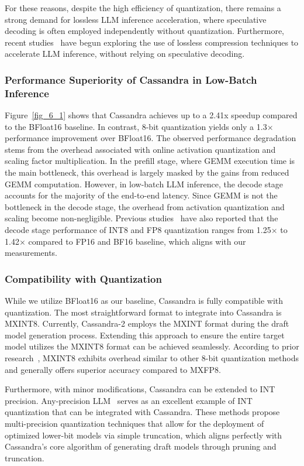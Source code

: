 For these reasons, despite the high efficiency of quantization, there remains a strong demand for lossless LLM inference acceleration, where speculative decoding is often employed independently without quantization. Furthermore, recent studies~\cite{dfloat11, LILO, Zipserv} have begun exploring the use of lossless compression techniques to accelerate LLM inference, without relying on speculative decoding.

\subsubsection{Performance Superiority of Cassandra in Low-Batch Inference}
Figure~\ref{fig_6_1} shows that Cassandra achieves up to a 2.41x speedup compared to the BFloat16 baseline. In contrast, 8-bit quantization yields only a 1.3$\times$ performance improvement over BFloat16. The observed performance degradation stems from the overhead associated with online activation quantization and scaling factor multiplication. In the prefill stage, where GEMM execution time is the main bottleneck, this overhead is largely masked by the gains from reduced GEMM computation. However, in low-batch LLM inference, the decode stage accounts for the majority of the end-to-end latency. Since GEMM is not the bottleneck in the decode stage, the overhead from activation quantization and scaling become non-negligible. Previous studies~\cite{Smoothquant, FP8-Quantization-Performance} have also reported that the decode stage performance of INT8 and FP8 quantization ranges from 1.25$\times$ to 1.42$\times$ compared to FP16 and BF16 baseline, which aligns with our measurements.

\subsubsection{Compatibility with Quantization}
While we utilize BFloat16 as our baseline, Cassandra is fully compatible with quantization. The most straightforward format to integrate into Cassandra is MXINT8. Currently, Cassandra-2 employs the MXINT format during the draft model generation process. Extending this approach to ensure the entire target model utilizes the MXINT8 format can be achieved seamlessly. According to prior research~\cite{INT-vs-FP}, MXINT8 exhibits overhead similar to other 8-bit quantization methods and generally offers superior accuracy compared to MXFP8.

Furthermore, with minor modifications, Cassandra can be extended to INT precision. Any-precision LLM~\cite{Any-Precision-LLM} serves as an excellent example of INT quantization that can be integrated with Cassandra. These methods propose multi-precision quantization techniques that allow for the deployment of optimized lower-bit models via simple truncation, which aligns perfectly with Cassandra’s core algorithm of generating draft models through pruning and truncation.





